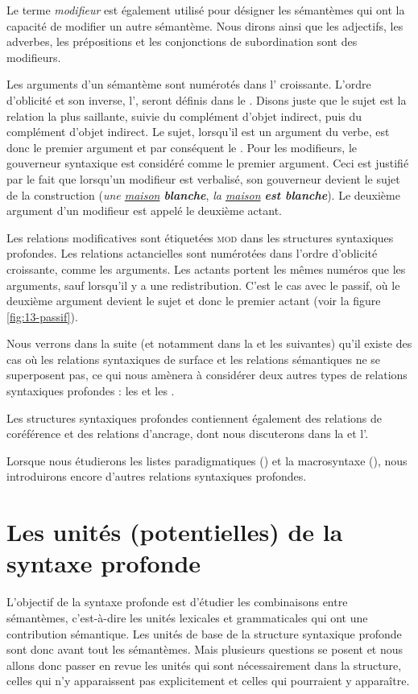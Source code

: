 Le terme \textit{modifieur} est également utilisé pour désigner les sémantèmes qui ont la capacité de modifier un autre sémantème. Nous dirons ainsi que les adjectifs, les adverbes, les prépositions et les conjonctions de subordination sont des modifieurs.

Les arguments d’un sémantème sont numérotés dans l’ croissante. L’ordre d’oblicité et son inverse, l’, seront définis dans le . Disons juste que le sujet est la relation la plus saillante, suivie du complément d’objet indirect, puis du complément d’objet indirect. Le sujet, lorsqu'il est un argument du verbe, est donc le premier argument et par conséquent le . Pour les modifieurs, le gouverneur syntaxique est considéré comme le premier argument. Ceci est justifié par le fait que lorsqu’un modifieur est verbalisé, son gouverneur devient le sujet de la construction (\textit{une \underline{maison} \textbf{blanche}}, \textit{la \underline{maison} \textbf{est blanche}}). Le deuxième argument d’un modifieur est appelé le deuxième actant.

Les relations modificatives sont étiquetées \textsc{mod} dans les structures syntaxiques profondes. Les relations actancielles sont numérotées dans l’ordre d’oblicité croissante, comme les arguments. Les actants portent les mêmes numéros que les arguments, sauf lorsqu'il y a une redistribution. C'est le cas avec le passif, où le deuxième argument devient le sujet et donc le premier actant (voir la figure \ref{fig:13-passif}).

Nous verrons dans la suite (et notamment dans la  et les suivantes) qu’il existe des cas où les relations syntaxiques de surface et les relations sémantiques ne se superposent pas, ce qui nous amènera à considérer deux autres types de relations syntaxiques profondes : les  et les .

Les structures syntaxiques profondes contiennent également des relations de coréférence et des relations d’ancrage, dont nous discuterons dans la  et l’.

Lorsque nous étudierons les listes paradigmatiques () et la macrosyntaxe (), nous introduirons encore d’autres relations syntaxiques profondes.

\section{Les unités (potentielles) de la syntaxe profonde}
\label{sec:13-unites}
L’objectif de la syntaxe profonde est d’étudier les combinaisons entre sémantèmes, c’est-à-dire les unités lexicales et grammaticales qui ont une contribution sémantique. Les unités de base de la structure syntaxique profonde sont donc avant tout les sémantèmes. Mais plusieurs questions se posent et nous allons donc passer en revue les unités qui sont nécessairement dans la structure, celles qui n’y apparaissent pas explicitement et celles qui pourraient y apparaître.

